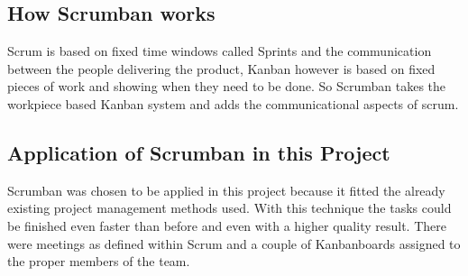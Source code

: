 \subsection{How Scrumban works}
Scrum is based on fixed time windows called Sprints and the communication between the people delivering the product, Kanban however is based on fixed pieces of work and showing when they need to be done. So Scrumban takes the workpiece based Kanban system and adds the communicational aspects of scrum.

\subsection{Application of Scrumban in this Project}
Scrumban was chosen to be applied in this project because it fitted the already existing project management methods used. With this technique the tasks could be finished even faster than before and even with a higher quality result. There were meetings as defined within Scrum and a couple of Kanbanboards assigned to the proper members of the team.
